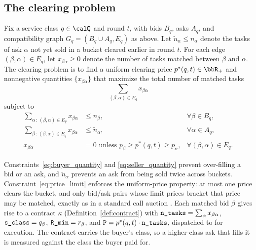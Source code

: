 \subsection{The clearing problem}
\label{sec:clearing_problem}

\begin{problem}
\label{prob:clearing}
Fix a service class $q \in \calQ$ and round $t$, with bids $B_q$, asks
$A_q$, and compatibility graph $G_q = (B_q \cup A_q, E_q)$ as above. Let
$\tilde n_\alpha \leq n_\alpha$ denote the tasks of ask $\alpha$ not yet sold
in a bucket cleared earlier in round $t$. For each edge
$(\beta, \alpha) \in E_q$, let $x_{\beta \alpha} \geq 0$ denote the number
of tasks matched between $\beta$ and $\alpha$. The \NoesisMarket{}
clearing problem is to find a uniform clearing price
$p^*(q, t) \in \bbR_+$ and nonnegative quantities $\{x_{\beta \alpha}\}$
that maximize the total number of matched tasks
\begin{equation}
  \label{eq:clearing_objective}
  \sum_{(\beta, \alpha) \in E_q} x_{\beta \alpha}
\end{equation}
subject to
\begin{align}
  \label{eq:buyer_quantity}
  \sum_{\alpha \,:\, (\beta, \alpha) \in E_q} x_{\beta \alpha}
    &\leq n_\beta, & \forall \beta \in B_q, \\
  \label{eq:seller_quantity}
  \sum_{\beta \,:\, (\beta, \alpha) \in E_q} x_{\beta \alpha}
    &\leq \tilde n_\alpha, & \forall \alpha \in A_q, \\
  \label{eq:price_limit}
  x_{\beta \alpha} &= 0
    \text{ unless } p_\beta \geq p^*(q, t) \geq p_\alpha,
    & \forall (\beta, \alpha) \in E_q.
\end{align}
\end{problem}

Constraints~\eqref{eq:buyer_quantity} and \eqref{eq:seller_quantity}
prevent over-filling a bid or an ask, and $\tilde n_\alpha$ prevents an
ask from being sold twice across buckets. Constraint~\eqref{eq:price_limit}
enforces the uniform-price property: at most one price clears the bucket,
and only bid/ask pairs whose limit prices bracket that price may be
matched, exactly as in a standard call auction \cite{mcafee1992}. Each
matched bid $\beta$ gives rise to a contract $\kappa$
(Definition~\ref{def:contract}) with
$\textnormal{\texttt{n\_tasks}} = \sum_\alpha x_{\beta \alpha}$,
$\textnormal{\texttt{s\_class}} = q_\beta$, $\textnormal{\texttt{R\_min}} = r_\beta$, and
$\textnormal{\texttt{P}} = p^*(q, t) \cdot \textnormal{\texttt{n\_tasks}}$, dispatched to \NoesisServer{}
for execution. The contract carries the buyer's class, so a higher-class ask
that fills it is measured against the class the buyer paid for.

